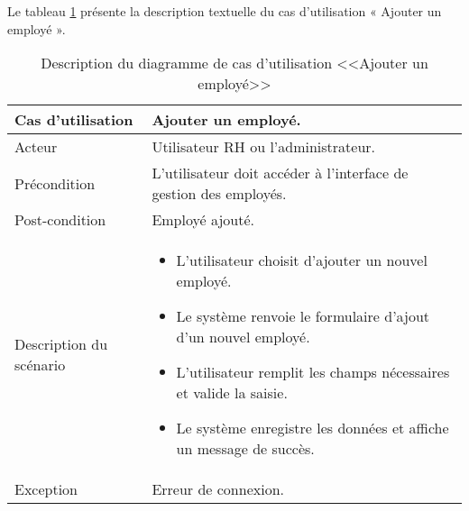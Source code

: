 Le tableau \ref{tab:Ajouteremployé} présente la description textuelle du cas d’utilisation « Ajouter un employé ».
\begin{longtable}[c]{
    |p{}
    |p{}|
}
    \caption{Description du diagramme de cas d’utilisation <<Ajouter un employé>>}
    \label{tab:Ajouteremployé}\\
    \hline
    
    Cas d’utilisation
    &  Ajouter un employé. \\
    \hline 
    
    Acteur
    & Utilisateur RH ou l'administrateur. \\
    \hline 
    
    Précondition
    & L'utilisateur doit accéder à l'interface de gestion des employés. \\
    \hline
    
    Post-condition
    & Employé ajouté. \\
    \hline
    
    Description du
scénario

    &     \begin{itemize}
    \item L’utilisateur choisit d'ajouter un nouvel employé.
    \item Le système renvoie le formulaire d’ajout d’un nouvel employé.
       \item L’utilisateur remplit les champs nécessaires et valide la saisie.
     \item Le système enregistre les données et affiche un message
de succès.

    \end{itemize} \\
    \hline
    
   Exception
    & Erreur de connexion.
 \\ \hline
   
\end{longtable}




